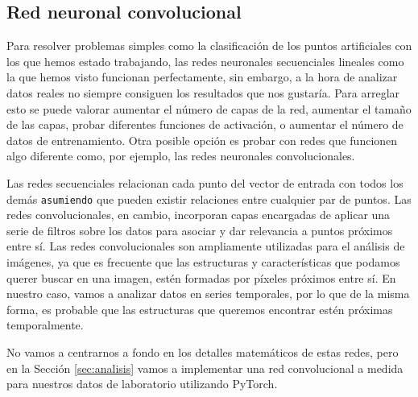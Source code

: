 \newpage
\subsection{Red neuronal convolucional}
Para resolver problemas simples como la clasificación de los puntos artificiales con los que hemos estado trabajando, las redes neuronales secuenciales lineales como la que hemos visto funcionan perfectamente, sin embargo, a la hora de analizar datos reales no siempre consiguen los resultados que nos gustaría. Para arreglar esto se puede valorar aumentar el número de capas de la red, aumentar el tamaño de las capas, probar diferentes funciones de activación, o aumentar el número de datos de entrenamiento. Otra posible opción es probar con redes que funcionen algo diferente como, por ejemplo, las redes neuronales convolucionales.

Las redes secuenciales relacionan cada punto del vector de entrada con todos los demás \texttt{asumiendo} que pueden existir relaciones entre cualquier par de puntos. Las redes convolucionales, en cambio, incorporan capas encargadas de aplicar una serie de filtros sobre los datos para asociar y dar relevancia a puntos próximos entre sí. Las redes convolucionales son ampliamente utilizadas para el análisis de imágenes, ya que es frecuente que las estructuras y características que podamos querer buscar en una imagen, estén formadas por píxeles próximos entre sí. En nuestro caso, vamos a analizar datos en series temporales, por lo que de la misma forma, es probable que las estructuras que queremos encontrar estén próximas temporalmente.

No vamos a centrarnos a fondo en los detalles matemáticos de estas redes, pero en la Sección \ref{sec:analisis} vamos a implementar una red convolucional a medida para nuestros datos de laboratorio utilizando PyTorch.